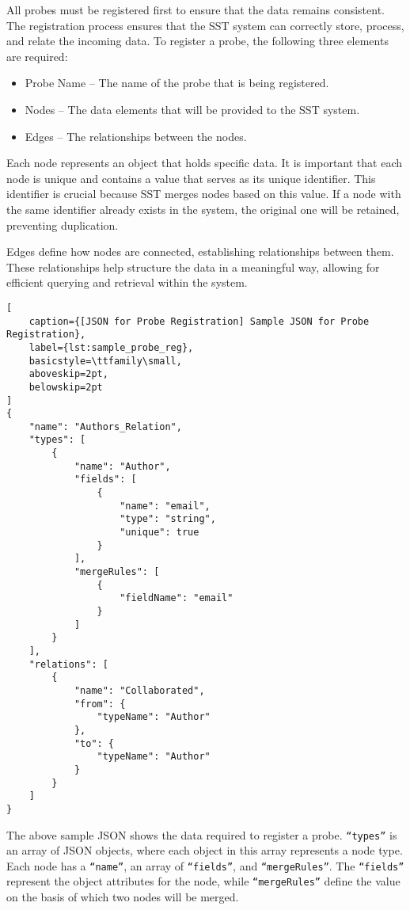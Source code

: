 All probes must be registered first to ensure that the data remains consistent. The registration process ensures that the SST system can correctly store, process, and relate the incoming data. To register a probe, the following three elements are required:

\begin{itemize}
    \item Probe Name – The name of the probe that is being registered.
    \item Nodes – The data elements that will be provided to the SST system.
    \item Edges – The relationships between the nodes.
\end{itemize}

Each node represents an object that holds specific data. It is important that each node is unique and contains a value that serves as its unique identifier. This identifier is crucial because SST merges nodes based on this value. If a node with the same identifier already exists in the system, the original one will be retained, preventing duplication.

Edges define how nodes are connected, establishing relationships between them. These relationships help structure the data in a meaningful way, allowing for efficient querying and retrieval within the system.
\begin{lstlisting}[
    caption={[JSON for Probe Registration] Sample JSON for Probe Registration}, 
    label={lst:sample_probe_reg},
    basicstyle=\ttfamily\small,
    aboveskip=2pt,
    belowskip=2pt
]
{
    "name": "Authors_Relation",
    "types": [
        {
            "name": "Author",
            "fields": [
                {
                    "name": "email",
                    "type": "string",
                    "unique": true
                }
            ],
            "mergeRules": [
                {
                    "fieldName": "email"
                }
            ]
        }
    ],
    "relations": [
        {
            "name": "Collaborated",
            "from": {
                "typeName": "Author"
            },
            "to": {
                "typeName": "Author"
            }
        }
    ]
}
\end{lstlisting}
\newpage
The above sample JSON shows the data required to register a probe. \texttt{``types''} is an array of JSON objects, where each object in this array represents a node type. Each node has a \texttt{``name''}, an array of \texttt{``fields''}, and \texttt{``mergeRules''}. The \texttt{``fields''} represent the object attributes for the node, while \texttt{``mergeRules''} define the value on the basis of which two nodes will be merged.  

